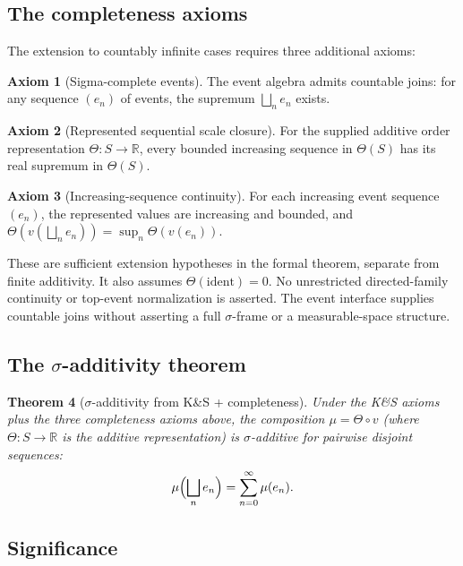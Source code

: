 \documentclass[11pt]{article}
\newtheorem{theorem}{Theorem}[section]
\theoremstyle{definition}
\newtheorem{axiom}[theorem]{Axiom}
\theoremstyle{remark}
\begin{document}
\subsection{The completeness axioms}

The extension to countably infinite cases requires three additional axioms:

\begin{axiom}[Sigma-complete events]
The event algebra admits countable joins: for any sequence $(e_n)$ of events,
the supremum $\bigsqcup_n e_n$ exists.
\end{axiom}

\begin{axiom}[Represented sequential scale closure]
For the supplied additive order representation $\Theta:S\to\mathbb{R}$,
every bounded increasing sequence in $\Theta(S)$ has its real supremum in $\Theta(S)$.
\end{axiom}

\begin{axiom}[Increasing-sequence continuity]
For each increasing event sequence $(e_n)$, the represented values are increasing
and bounded, and
$\Theta(v(\bigsqcup_n e_n))=\sup_n\Theta(v(e_n))$.
\end{axiom}

These are sufficient extension hypotheses in the formal theorem, separate from
finite additivity. It also assumes $\Theta(\mathrm{ident})=0$. No unrestricted
directed-family continuity or top-event normalization is asserted. The event
interface supplies countable joins without asserting a full $\sigma$-frame
or a measurable-space structure.

\subsection{The $\sigma$-additivity theorem}

\begin{theorem}[$\sigma$-additivity from K\&S + completeness]
Under the K\&S axioms plus the three completeness axioms above, the composition
$\mu = \Theta \circ v$ (where $\Theta : S \to \mathbb{R}$ is the additive representation)
is $\sigma$-additive for pairwise disjoint sequences:
\[
\mu\Bigl(\bigsqcup_n e_n\Bigr) = \sum_{n=0}^\infty \mu(e_n).
\]
\end{theorem}


\subsection{Significance}
\end{document}
